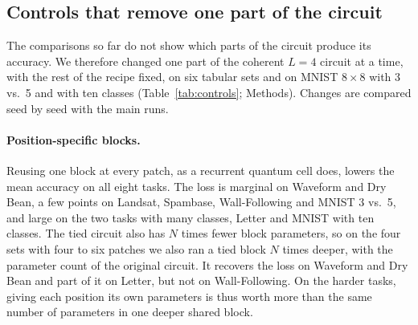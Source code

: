 \documentclass[11pt]{article}
\begin{document}
\subsection{Controls that remove one part of the circuit}
\label{sec:res-controls}

The comparisons so far do not show which parts of the circuit produce its accuracy. We therefore changed one part of the coherent $L=4$ circuit at a time, with the rest of the recipe fixed, on six tabular sets and on MNIST $8\times8$ with 3 vs.\ 5 and with ten classes (Table~\ref{tab:controls}; Methods). Changes are compared seed by seed with the main runs.

\begin{table}[t]
  \centering
  \caption{Controls of the coherent circuit with $L=4$. Test accuracy (\%), mean $\pm$ standard deviation over three seeds; $k$ classes, $N$ patches. Tied blocks: one block $W$ reused at every patch. Tied, same parameters: the tied block with $NL$ layers, which restores the parameter count, run on the sets with four to six patches. Product gates: every $\mathrm{CRot}$ replaced by a $\mathrm{Rot}$ on its target with the same angles, so that the state stays a product state and the parameter count is unchanged. Frozen random: block angles uniform in $[-\pi,\pi)$, encoding at its initial values, only the linear head trained. Feature order: change of the test accuracy, seed 42, for three random orders of the tabular features against the file order.}
  \label{tab:controls}
  \footnotesize
  \setlength{\tabcolsep}{4pt}
  \resizebox{\textwidth}{!}{}
\end{table}

\paragraph{Position-specific blocks.}
Reusing one block at every patch, as a recurrent quantum cell does, lowers the mean accuracy on all eight tasks. The loss is marginal on Waveform and Dry Bean, a few points on Landsat, Spambase, Wall-Following and MNIST 3 vs.\ 5, and large on the two tasks with many classes, Letter and MNIST with ten classes. The tied circuit also has $N$ times fewer block parameters, so on the four sets with four to six patches we also ran a tied block $N$ times deeper, with the parameter count of the original circuit. It recovers the loss on Waveform and Dry Bean and part of it on Letter, but not on Wall-Following. On the harder tasks, giving each position its own parameters is thus worth more than the same number of parameters in one deeper shared block.
\end{document}
